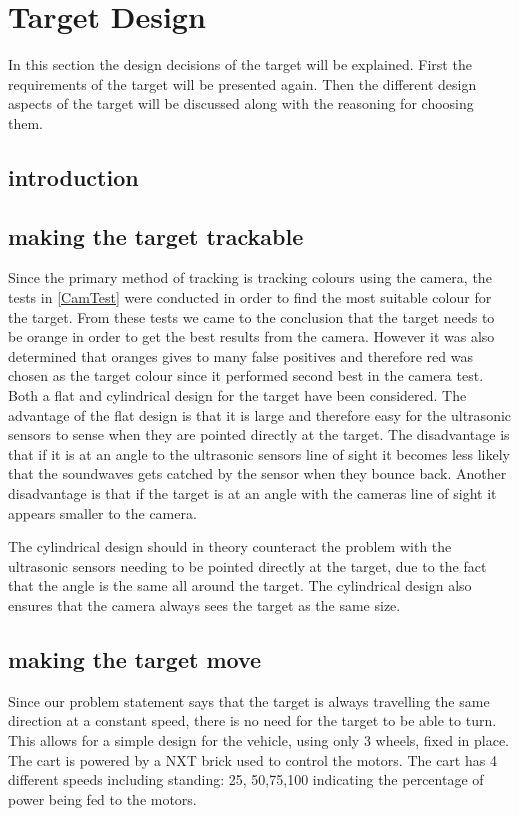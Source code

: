 \section{Target Design}\label{targetDesign}
In this section the design decisions of the target will be explained. First the
requirements of the target will be presented again. Then the different design
aspects of the target will be discussed along with the reasoning for choosing them.
\subsection{introduction}

\subsection{making the target trackable}
Since the primary method of tracking is tracking colours using the camera, the
tests in \autoref{CamTest} were conducted in order to find the most suitable
colour for the target. From these tests we came to the conclusion that the target
needs to be orange in order to get the best results from the camera. However it
was also determined that oranges gives to many false positives and therefore red
was chosen as the target colour since it performed second best in the camera test.
\nl
Both a flat and cylindrical design for the target have been considered. The
advantage of the flat design is that it is large and therefore easy for the ultrasonic
sensors to sense when they are pointed directly at the target. The disadvantage
is that if it is at an angle to the ultrasonic sensors line of sight it
becomes less likely that the soundwaves gets catched by the sensor when they
bounce back. Another disadvantage is that if the target is at an angle with the
cameras line of sight it appears smaller to the camera.\nl

The cylindrical design should in theory counteract the problem with the
ultrasonic sensors needing to be pointed directly at the target, due to the
fact that the angle is the same all around the target. The cylindrical design
also ensures that the camera always sees the target as the same size.\nl

\subsection{making the target move}
Since our problem statement says that the target is always travelling the same direction
at a constant speed, there is no need for the target to be able to turn. This allows
for a simple design for the vehicle, using only 3 wheels, fixed in place. The cart
is powered by a NXT brick used to control the motors. The cart has 4 different speeds including standing:
25, 50,75,100 indicating the percentage of power being fed to the motors. \nl

